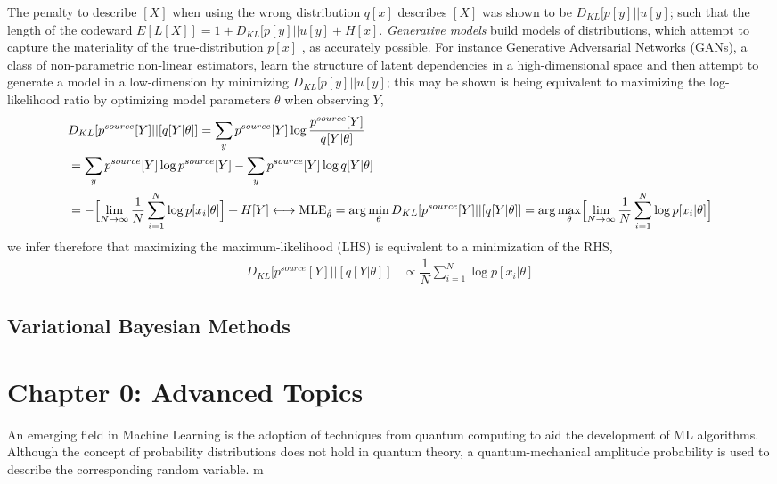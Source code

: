 \documentclass[7pt]{article}
\begin{document}
The penalty  to describe $[X]$ when using the wrong distribution $q[x]$ describes $[X]$ was shown to be $D_{KL} [p[y]||u[y]$; such that the length of the codeward $E[L[X]] = 1+ D_{KL} [p[y]||u[y] +  H[x]$. \emph{Generative models} build models of distributions, which attempt to capture the materiality of the true-distribution $p[x]$ , as accurately  possible. For instance Generative Adversarial Networks (GANs), a class of non-parametric non-linear estimators, learn the structure of latent dependencies in a high-dimensional space and then attempt to generate a model in a low-dimension by minimizing $D_{KL} [p[y]||u[y]$; this may be shown is being equivalent to maximizing the log-likelihood ratio by optimizing model parameters $\theta$ when observing $Y$,
\begin{equation}
\begin{split}
& D_{KL} [p^{source}[Y]||[q[Y|\theta]] = \sum_{y} p^{source}[Y] \log \dfrac{p^{source}[Y]}{q[Y|\theta]}  \\
& =   \sum_{y} p^{source}[Y] \log {p^{source}[Y] } - \sum_{y} p^{source}[Y] \log {q[Y|\theta]}\\
& =   - \Bigl[ \lim\limits_{ N \rightarrow \infty } \dfrac{1}{N} \sum^N_{i=1} \log p[x_i|\theta]\Bigr]+ H[Y]  \longleftrightarrow \text{MLE}_{\hat{\theta}} = \arg \min_{\theta} D_{KL} [p^{source}[Y]||[q[Y|\theta]] = \arg \max_{\theta} \Bigl[ \lim\limits_{ N \rightarrow \infty } \dfrac{1}{N} \sum^N_{i=1} \log p[x_i|\theta]\Bigr]  \\
\end{split}
\end{equation}
we infer therefore that maximizing the maximum-likelihood (LHS) is equivalent to a minimization of the RHS,
\begin{equation}
\begin{split}
D_{KL} [p^{source}[Y]||[q[Y|\theta]] &  \propto \dfrac{1}{N} \sum^N_{i=1} \log p[x_i|\theta]
\end{split}
\end{equation}
\subsection{Variational Bayesian Methods}

\section{Chapter 0: Advanced Topics}
An emerging field in Machine Learning is the adoption of techniques from quantum computing to aid the development of ML algorithms.
Although the concept of probability distributions does not hold in quantum theory, a quantum-mechanical amplitude probability is used to describe the corresponding random variable.
m
\end{document}
